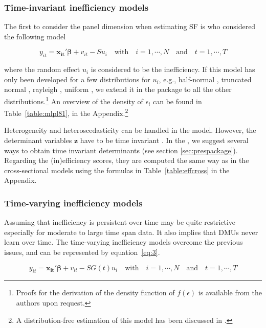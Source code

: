 \documentclass[nojss]{jss}
\begin{document}
\subsubsection{Time-invariant inefficiency models}

The first to consider the panel dimension when estimating SF is \citet{pl81} who
considered the following model

\begin{equation} \label{eq:2}
y_{it} = \mathbf{x_{it}'}\bm{\beta} + v_{it} - Su_i \quad \text{with} \quad i = 1, \cdots, N \quad \text{and} \quad t = 1, \cdots, T
\end{equation}

where the random effect $u_i$ is considered to be the inefficiency. If this model
has only been developed for a few distributions for $u_i$, e.g., half-normal \citep{pl81}, 
truncated normal \citep{batt88}, rayleigh \citep{hajar15}, uniform \citep{nguyen10}, we extend it in the  package to all the
other distributions.\footnote{Proofs for the derivation of the density function
of $f(\epsilon)$ is available from the authors upon request.} 
An overview of the density of $\epsilon_i$ can be found in 
Table~\ref{table:mlpl81}, in the Appendix.\footnote{A distribution-free 
estimation of this model has been discussed in \citet{sl84}.}

Heterogeneity and heteroscedasticity can be handled in the \citet{pl81} model.
However, the determinant variables $\mathbf{z}$ have to be time invariant \citep{kum2000}. In the
, we suggest several ways to obtain time invariant determinants (see section \ref{sec:prespackage}).
Regarding the (in)efficiency scores, they are computed the same way as in the 
cross-sectional models using the formulas in Table~\ref{table:effcross} in the 
Appendix.

\subsubsection{Time-varying inefficiency models}

Assuming that inefficiency is persistent over time may be quite restrictive 
especially for moderate to large time span data. It also implies that DMUs
never learn over time. The time-varying inefficiency models overcome the 
previous issues, and can be represented by equation~\ref{eq:3}.

\begin{equation} \label{eq:3}
y_{it} = \mathbf{x_{it}'}\bm{\beta} + v_{it} - SG(t)u_i \quad \text{with} \quad i = 1, \cdots, N \quad \text{and} \quad t = 1, \cdots, T
\end{equation}
\end{document}
